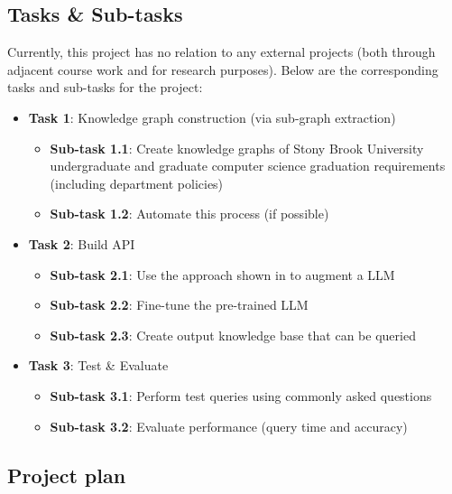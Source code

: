 \documentclass[12pt]{article}
\begin{document}
    \subsection{Tasks \& Sub-tasks}
    \label{subsec:tasks}
    Currently, this project has no relation to any external projects (both through adjacent course work and for research purposes). Below are the corresponding tasks and sub-tasks for the project:

    \begin{itemize}
        \item \textbf{Task 1}: Knowledge graph construction (via sub-graph extraction\cite{He-WSDM-2021})
        \begin{itemize}
            \item \textbf{Sub-task 1.1}: Create knowledge graphs of Stony Brook University undergraduate and graduate computer science graduation requirements (including department policies)
            \item \textbf{Sub-task 1.2}: Automate this process (if possible)
        \end{itemize}
        \item \textbf{Task 2}: Build API
        \begin{itemize}
            \item \textbf{Sub-task 2.1}: Use the approach shown in \cite{luo2024} to augment a LLM \cite{alpaca,touvron2023llama,touvron2023llama2,ye2023gpt3.5}
            \item \textbf{Sub-task 2.2}: Fine-tune the pre-trained LLM
            \item \textbf{Sub-task 2.3}: Create output knowledge base that can be queried
        \end{itemize}
        \item \textbf{Task 3}: Test \& Evaluate
        \begin{itemize}
            \item \textbf{Sub-task 3.1}: Perform test queries using commonly asked questions
            \item \textbf{Sub-task 3.2}: Evaluate performance (query time and accuracy)
        \end{itemize}
    \end{itemize}

    \subsection{Project plan} 
    \label{subsec:plan}
    
\end{document}
